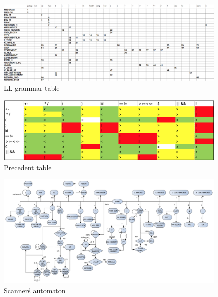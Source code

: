\documentclass[11pt, titlepage]{article}
\begin{document}
\begin{center}
	\begin{figure}
		\includegraphics[width=\linewidth]{LL_table}
		\caption{LL grammar table}
		\label{fig:LLtable}
	\end{figure}
\end{center}

\begin{center}
	\begin{figure}
		\includegraphics[width=\linewidth]{precedent}
		\caption{Precedent table}
		\label{fig:PreTable}
	\end{figure}
\end{center}

\begin{center}
	\begin{landscape}
	\begin{figure}
		\includegraphics[width=\linewidth]{scannerAutomaton}
		\caption{Scanner\'s automaton}
		\label{fig:automaton}
	\end{figure}
	\end{landscape}
\end{center}
\end{document}
